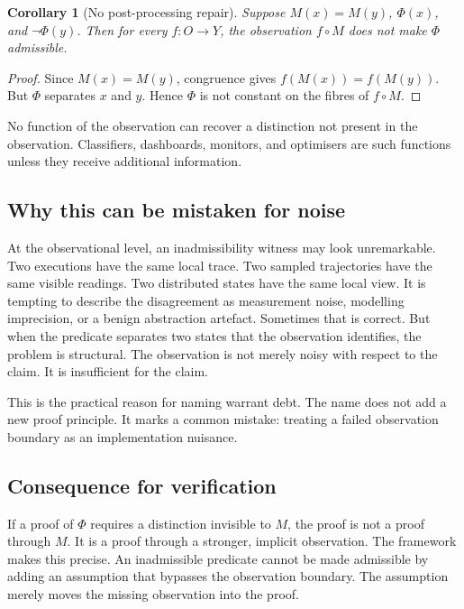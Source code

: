 \documentclass[a4paper,11pt]{article}
\newtheorem{corollary}[theorem]{Corollary}
\begin{document}
\begin{corollary}[No post-processing repair]
\label{cor:no-repair}
Suppose \(M(x)=M(y)\), \(\Phi(x)\), and \(\neg\Phi(y)\). Then for every
\(f:O\to Y\), the observation \(f\circ M\) does not make \(\Phi\) admissible.
\end{corollary}

\begin{proof}
Since \(M(x)=M(y)\), congruence gives \(f(M(x))=f(M(y))\). But \(\Phi\)
separates \(x\) and \(y\). Hence \(\Phi\) is not constant on the fibres of
\(f\circ M\).
\end{proof}

No function of the observation can recover a distinction not present in the
observation. Classifiers, dashboards, monitors, and optimisers are such
functions unless they receive additional information.

\subsection{Why this can be mistaken for noise}

At the observational level, an inadmissibility witness may look unremarkable.
Two executions have the same local trace. Two sampled trajectories have the
same visible readings. Two distributed states have the same local view. It is
tempting to describe the disagreement as measurement noise, modelling
imprecision, or a benign abstraction artefact. Sometimes that is correct. But
when the predicate separates two states that the observation identifies, the
problem is structural. The observation is not merely noisy with respect to the
claim. It is insufficient for the claim.

This is the practical reason for naming warrant debt. The name does not add a
new proof principle. It marks a common mistake: treating a failed observation
boundary as an implementation nuisance.

\subsection{Consequence for verification}

If a proof of \(\Phi\) requires a distinction invisible to \(M\), the proof is
not a proof through \(M\). It is a proof through a stronger, implicit
observation. The framework makes this precise. An inadmissible predicate cannot
be made admissible by adding an assumption that bypasses the observation
boundary. The assumption merely moves the missing observation into the proof.
\end{document}
